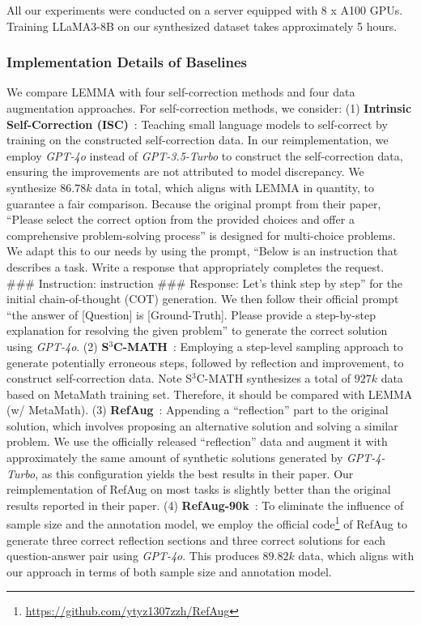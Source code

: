 All our experiments were conducted on a server equipped with 8 x A100 GPUs. Training LLaMA3-8B on our synthesized dataset takes approximately 5 hours. 

\subsubsection{Implementation Details of Baselines}
\label{sec:baseline_details}


We compare LEMMA with four self-correction methods and four data augmentation approaches. For self-correction methods, we consider:
(1) \textbf{Intrinsic Self-Correction (ISC)}~\cite{han2024small}: Teaching small language models to self-correct by training on the constructed self-correction data. In our reimplementation, we employ \textit{GPT-4o} instead of \textit{GPT-3.5-Turbo} to construct the self-correction data, ensuring the improvements are not attributed to model discrepancy. We synthesize $86.78k$ data in total, which aligns with LEMMA in quantity, to guarantee a fair comparison. Because the original prompt from their paper, ``Please select the correct option from the provided choices and offer a comprehensive problem-solving process'' is designed for multi-choice problems. We adapt this to our needs by using the prompt, ``Below is an instruction that describes a task. Write a response that appropriately completes the request. \#\#\# Instruction: {instruction} \#\#\# Response: Let's think step by step'' for the initial chain-of-thought (COT) generation. We then follow their official prompt ``the answer of [Question] is [Ground-Truth]. Please provide a step-by-step explanation for resolving the given problem'' to generate the correct solution using \textit{GPT-4o}.
(2) \textbf{S$^3$C-MATH}~\cite{yan2024s}: Employing a step-level sampling approach to generate potentially erroneous steps, followed by reflection and improvement, to construct self-correction data. Note S$^3$C-MATH synthesizes a total of $927k$ data based on MetaMath training set. Therefore, it should be compared with LEMMA (w/ MetaMath).
(3) \textbf{RefAug}~\cite{zhang-etal-2024-learn}: Appending a ``reflection'' part to the original solution, which involves proposing an alternative solution and solving a similar problem. We use the officially released ``reflection'' data and augment it with approximately the same amount of synthetic solutions generated by \textit{GPT-4-Turbo}, as this configuration yields the best results in their paper. Our reimplementation of RefAug on most tasks is slightly better than the original results reported in their paper.
(4) \textbf{RefAug-90k}~\cite{zhang-etal-2024-learn}: To eliminate the influence of sample size and the annotation model, we employ the official code\footnote{\url{https://github.com/ytyz1307zzh/RefAug}} of RefAug to generate three correct reflection sections and three correct solutions for each question-answer pair using \textit{GPT-4o}. This produces $89.82k$ data, which aligns with our approach in terms of both sample size and annotation model.

